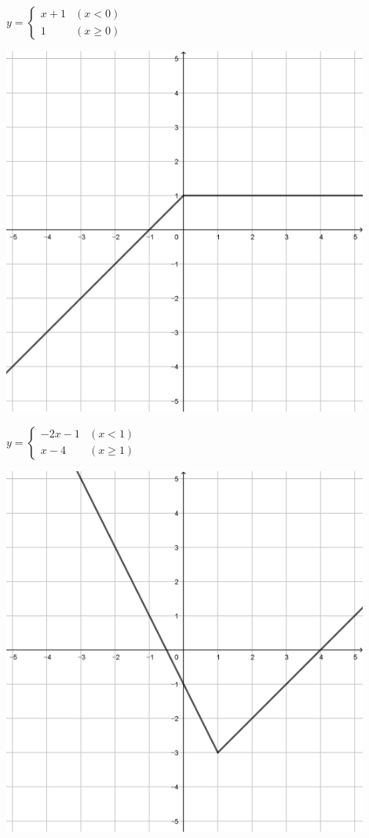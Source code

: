 \documentclass[a4paper]{oblivoir}
\begin{document}
\begin{minipage}{0.45\textwidth}\centering
\(y=\begin{cases}x+1&(x<0)\\1&(x\ge0)\end{cases}\)
\par\bigskip\includegraphics[width=0.9\textwidth]{img/12-3}
\end{minipage}
\begin{minipage}{0.45\textwidth}\centering
\(y=\begin{cases}-2x-1&(x<1)\\x-4&(x\ge1)\end{cases}\)
\par\bigskip\includegraphics[width=0.9\textwidth]{img/12-4}
\end{minipage}\bigskip\bigskip\par
\end{document}
